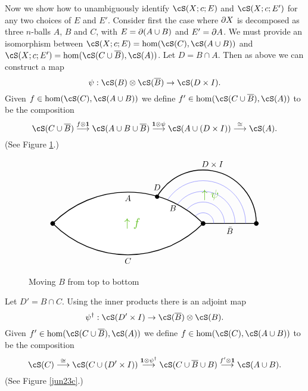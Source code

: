 Now we show how to unambiguously identify $\cS(X; c; E)$ and $\cS(X; c; E')$ for any
two choices of $E$ and $E'$.
Consider first the case where $\partial X$ is decomposed as three $n$-balls $A$, $B$ and $C$,
with $E = \partial(A\cup B)$ and $E' = \partial A$.
We must provide an isomorphism between $\cS(X; c; E) = \hom(\cS(C), \cS(A\cup B))$
and $\cS(X; c; E') = \hom(\cS(C\cup \ol{B}), \cS(A))$.
Let $D = B\cap A$.
Then as above we can construct a map
\[
	\psi: \cS(B)\ot\cS(\ol{B}) \to \cS(D\times I) .
\]
Given $f\in \hom(\cS(C), \cS(A\cup B))$ we define $f'\in \hom(\cS(C\cup \ol{B}), \cS(A))$
to be the composition
\[
	\cS(C\cup \ol{B}) \stackrel{f\ot\id}{\longrightarrow}
		\cS(A\cup B\cup \ol{B})  \stackrel{\id\ot\psi}{\longrightarrow}
			\cS(A\cup(D\times I)) \stackrel{\cong}{\longrightarrow} \cS(A) .
\]
(See Figure \ref{jun23b}.)
\begin{figure}[t]
$$
\begin{tikzpicture}[baseline,line width = 1pt,x=1.5cm,y=1.5cm]
\draw (0,0) node(R) {}
	-- (0.75,0) node[below] {$\bar{B}$}
	--(1.5,0)  node[circle,fill=black,inner sep=2pt] {}
	arc (0:80:1.5) node[above] {$D \times I$}
	arc (80:180:1.5);
\foreach \r in {0.3, 0.6, 0.9, 1.2} {
	\draw[blue!50, line width = 0.5pt] (\r,0) arc (0:180:\r);
}
\draw[fill=white]
	(R) node[circle,fill=black,inner sep=2pt] {}
	arc (45:65:3) node[below] {$B$}
	arc (65:90:3) node[below] {$A$}
	arc (90:135:3) node[circle,fill=black,inner sep=2pt] {}
	arc (-135:-90:3) node[below] {$C$}
	arc (-90:-45:3);
\draw[fill]  (150:1.5) circle (2pt) node[above=4pt] {$D$};
\node[green!50!brown] at (-2,0) {\scalebox{1.4}{$\uparrow f$}};
\node[green!50!brown] at (0.2,0.8) {\scalebox{1.4}{$\uparrow \psi$}};
\end{tikzpicture}
$$
\caption{Moving $B$ from top to bottom}
\label{jun23b}
\end{figure}
Let $D' = B\cap C$.
Using the inner products there is an adjoint map
\[
	\psi^\dagger: \cS(D'\times I) \to \cS(\ol{B})\ot\cS(B) .
\]
Given $f'\in \hom(\cS(C\cup \ol{B}), \cS(A))$ we define $f\in \hom(\cS(C), \cS(A\cup B))$
to be the composition
\[
	\cS(C) \stackrel{\cong}{\longrightarrow}
		\cS(C\cup(D'\times I)) \stackrel{\id\ot\psi^\dagger}{\longrightarrow}
			\cS(C\cup \ol{B}\cup B)   \stackrel{f'\ot\id}{\longrightarrow}
				\cS(A\cup B) .
\]
(See Figure \ref{jun23c}.)
